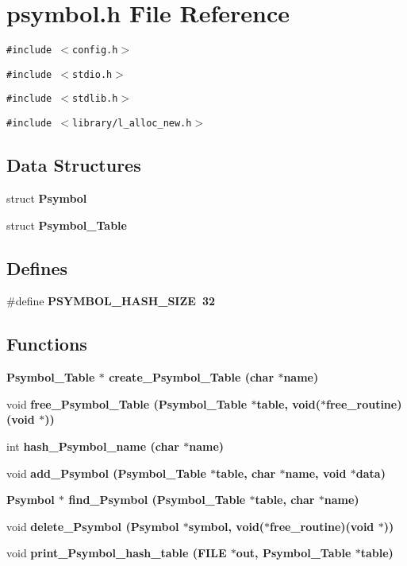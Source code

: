 \section{psymbol.h File Reference}
\label{psymbol_8h}
{\tt \#include $<$config.h$>$}\par
{\tt \#include $<$stdio.h$>$}\par
{\tt \#include $<$stdlib.h$>$}\par
{\tt \#include $<$library/l\_\-alloc\_\-new.h$>$}\par
\subsection*{Data Structures}
\begin{CompactItemize}
\item 
struct \bf{Psymbol}
\item 
struct \bf{Psymbol\_\-Table}
\end{CompactItemize}
\subsection*{Defines}
\begin{CompactItemize}
\item 
\#define \bf{PSYMBOL\_\-HASH\_\-SIZE}~32
\end{CompactItemize}
\subsection*{Functions}
\begin{CompactItemize}
\item 
\bf{Psymbol\_\-Table} $\ast$ \bf{create\_\-Psymbol\_\-Table} (char $\ast$\bf{name})
\item 
void \bf{free\_\-Psymbol\_\-Table} (\bf{Psymbol\_\-Table} $\ast$table, void($\ast$free\_\-routine)(void $\ast$))
\item 
int \bf{hash\_\-Psymbol\_\-name} (char $\ast$\bf{name})
\item 
void \bf{add\_\-Psymbol} (\bf{Psymbol\_\-Table} $\ast$table, char $\ast$\bf{name}, void $\ast$data)
\item 
\bf{Psymbol} $\ast$ \bf{find\_\-Psymbol} (\bf{Psymbol\_\-Table} $\ast$table, char $\ast$\bf{name})
\item 
void \bf{delete\_\-Psymbol} (\bf{Psymbol} $\ast$symbol, void($\ast$free\_\-routine)(void $\ast$))
\item 
void \bf{print\_\-Psymbol\_\-hash\_\-table} (FILE $\ast$\bf{out}, \bf{Psymbol\_\-Table} $\ast$table)
\end{CompactItemize}
